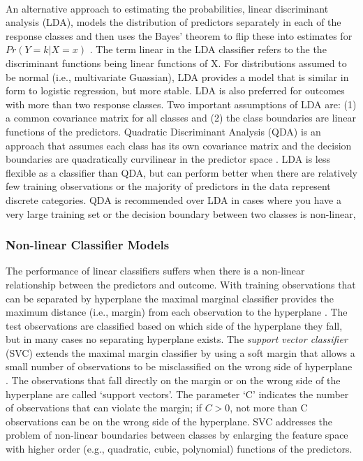 \\\documentclass[sigconf]{acmart}
\begin{document}
An alternative approach to estimating the probabilities, linear discriminant 
analysis (LDA), models the distribution of predictors separately in each of 
the response classes and then uses the Bayes' theorem to flip these into 
estimates for $Pr(Y=k | X=x)$ \cite{james13}. The term linear in the LDA 
classifier refers to the the discriminant functions being linear functions of 
X. For distributions assumed to be normal (i.e., multivariate Guassian), LDA 
provides a model that is similar in form to logistic regression, but more 
stable. LDA is also preferred for outcomes with more than two response classes. 
Two important assumptions of LDA are: (1) a common covariance matrix for all 
classes and (2) the class boundaries are linear functions of the predictors.   
Quadratic Discriminant Analysis (QDA) is an approach that assumes each class 
has its own covariance matrix and the decision boundaries are quadratically
curvilinear in the predictor space \cite{kuhn13}. LDA is less flexible 
as a classifier than QDA, but can perform better when there are relatively 
few training observations or the majority of predictors in the data represent 
discrete categories. QDA is recommended over LDA in cases where you have a 
very large training set or the decision boundary between two classes is 
non-linear, 


\subsubsection{Non-linear Classifier Models}

The performance of linear classifiers suffers when there is a non-linear 
relationship between the predictors and outcome. With training observations 
that can be separated by hyperplane the maximal marginal classifier provides 
the maximum distance (i.e., margin) from each observation to the hyperplane 
\cite{james13}. The test observations are classified based on which side of 
the hyperplane they fall, but in many cases no separating hyperplane exists. 
The \emph{support vector classifier} (SVC) extends the maximal margin 
classifier by using a soft margin that allows a small number of observations 
to be misclassified on the wrong side of hyperplane \cite{kuhn13, cortes95}. 
The observations that fall directly on the margin or on the wrong side of the 
hyperplane are called `support vectors'. The parameter `C' indicates the number 
of observations that can violate the margin; if $C>0$, not more than C 
observations can be on the wrong side of the hyperplane. SVC addresses the 
problem of non-linear boundaries between classes by enlarging the feature 
space with higher order (e.g., quadratic, cubic, polynomial) functions of 
the predictors. 
\end{document}
